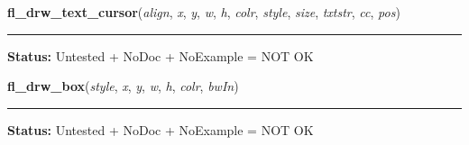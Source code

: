 \hspace{.8\funcindent}\begin{boxedminipage}{\funcwidth}

    \raggedright \textbf{fl\_drw\_text\_cursor}(\textit{align}, \textit{x}, \textit{y}, \textit{w}, \textit{h}, \textit{colr}, \textit{style}, \textit{size}, \textit{txtstr}, \textit{cc}, \textit{pos})

    \vspace{-1.5ex}

    \rule{\textwidth}{0.5\fboxrule}
\setlength{\parskip}{2ex}
\setlength{\parskip}{1ex}
\textbf{Status:} Untested + NoDoc + NoExample = NOT OK



    \end{boxedminipage}

    \label{xformslib:library:fl_drw_box}

    \vspace{0.5ex}

\hspace{.8\funcindent}\begin{boxedminipage}{\funcwidth}

    \raggedright \textbf{fl\_drw\_box}(\textit{style}, \textit{x}, \textit{y}, \textit{w}, \textit{h}, \textit{colr}, \textit{bwIn})

    \vspace{-1.5ex}

    \rule{\textwidth}{0.5\fboxrule}
\setlength{\parskip}{2ex}
\setlength{\parskip}{1ex}
\textbf{Status:} Untested + NoDoc + NoExample = NOT OK



    \end{boxedminipage}

    \label{xformslib:library:fl_add_symbol}

    \vspace{0.5ex}


